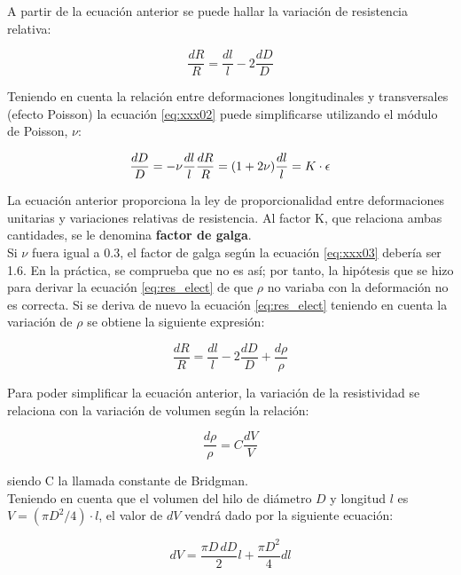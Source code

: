 A partir de la ecuación anterior se puede hallar la variación de resistencia relativa:

\begin{equation}\label{eq:xxx02}
\frac{dR}{R} = \frac{dl}{l} - 2 \frac{dD}{D}
\end{equation}

Teniendo en cuenta la relación entre deformaciones longitudinales y transversales (efecto Poisson) 
la ecuación \ref{eq:xxx02} puede simplificarse utilizando el módulo de Poisson, $\nu$:

\begin{equation}\label{eq:xxx03}
\frac{dD}{D} = -\nu \frac{dl}{l} \\ 
\frac{dR}{R} = (1 + 2\nu) \frac{dl}{l} = K \cdot \epsilon
\end{equation}

La ecuación anterior proporciona la ley de proporcionalidad entre deformaciones unitarias y 
variaciones relativas de resistencia. Al factor K, que relaciona ambas cantidades, se le denomina 
\textbf{factor de galga}.\\

Si $\nu$ fuera igual a 0.3, el factor de galga según la ecuación \ref{eq:xxx03} debería 
ser 1.6. En la práctica, se comprueba que no es así; por tanto, la hipótesis que se hizo 
para derivar la ecuación \ref{eq:res_elect} de que $\rho$ no variaba con la deformación 
no es correcta. Si se deriva de nuevo la ecuación \ref{eq:res_elect} teniendo en cuenta la 
variación de $\rho$ se obtiene la siguiente expresión:

\begin{equation}\label{eq:xxx37}
\frac{dR}{R} = \frac{dl}{l} - 2\frac{dD}{D} + \frac{d\rho}{\rho}
\end{equation}

Para poder simplificar la ecuación anterior, la variación de la resistividad se relaciona 
con la variación de volumen según la relación:

\begin{equation}\label{eq:xxx38}
\frac{d\rho}{\rho} = C \frac{dV}{V}
\end{equation}

siendo C la llamada constante de Bridgman.\\

Teniendo en cuenta que el volumen del hilo de diámetro $D$ y longitud $l$ es $V = (\pi D^2 / 4) \cdot l$, 
el valor de $dV$ vendrá dado por la siguiente ecuación:

\begin{equation}
dV = \frac{\pi D \, dD}{2} l + \frac{\pi D^2}{4} dl
\end{equation}

